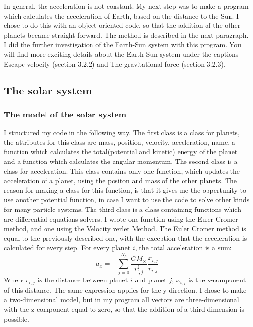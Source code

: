 \documentclass{article}
\begin{document}
In general, the acceleration is not constant. My next step was to make a program which calculates the acceleration of Earth, based on the distance to the Sun. I chose to do this with an object oriented code, so that the addition of the other planets became straight forward. The method is described in the next paragraph. I did the further investigation of the Earth-Sun system with this program. You will find more exciting details about the Earth-Sun system under the captions Escape velocity (section 3.2.2) and The gravitational force (section 3.2.3). 

\subsection{The solar system}
\subsubsection{The model of the solar system}
I structured my code in the following way. The first class is a class for planets, the attributes for this class are mass, position, velocity, acceleration, name, a function which calculates the total(potential and kinetic) energy of the planet and a function which calculates the angular momentum. The second class is a class for acceleration. This class contains only one function, which updates the acceleration of a planet, using the positon and mass of the other planets. The reason for making a class for this function, is that it gives me the oppertunity to use another potential function, in  case I want to use the code to solve other kinds for many-particle systems. The third class is a class containing functions which are differential equations solvers. I wrote one function using the Euler Cromer method, and one using the Velocity verlet Method. The Euler Cromer method is equal to the previously described one, with the exception that the acceleration is calculated for every step. For every planet $i$, the total acceleration is a sum:
\begin{equation} \label{eqn1}
a_x=-\sum\limits_{j=0}^{N_p} \frac{GM_{\odot}}{r_{i,j}^2} \frac{x_{i,j}}{r_{i,j}}
\end{equation}
Where $r_{i,j}$ is the distance between planet $i$ and planet $j$, $x_{i,j}$ is the x-component of this distance. The same expression applies for the y-direction. I chose to make a two-dimensional model, but in my program all vectors are three-dimensional with the z-component equal to zero, so that the addition of a third dimension is possible.
\end{document}
